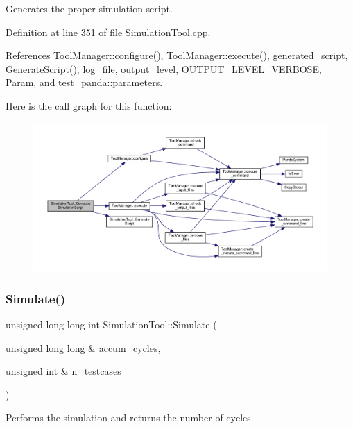 Generates the proper simulation script. 



Definition at line 351 of file Simulation\+Tool.\+cpp.



References Tool\+Manager\+::configure(), Tool\+Manager\+::execute(), generated\+\_\+script, Generate\+Script(), log\+\_\+file, output\+\_\+level, O\+U\+T\+P\+U\+T\+\_\+\+L\+E\+V\+E\+L\+\_\+\+V\+E\+R\+B\+O\+SE, Param, and test\+\_\+panda\+::parameters.

Here is the call graph for this function\+:
\nopagebreak
\begin{figure}[H]
\begin{center}
\leavevmode
\includegraphics[width=350pt]{d5/dfc/classSimulationTool_a7fde58cff0f6cf25ae672c148e708c06_cgraph}
\end{center}
\end{figure}
\mbox{\label{classSimulationTool_a1686af5b980c7e8dfa848ff616384627}} 
\subsubsection{\texorpdfstring{Simulate()}{Simulate()}}
{\footnotesize\ttfamily unsigned long long int Simulation\+Tool\+::\+Simulate (\begin{DoxyParamCaption}\item[{unsigned long long \&}]{accum\+\_\+cycles,  }\item[{unsigned int \&}]{n\+\_\+testcases }\end{DoxyParamCaption})\hspace{0.3cm}{\ttfamily [virtual]}}



Performs the simulation and returns the number of cycles. 

